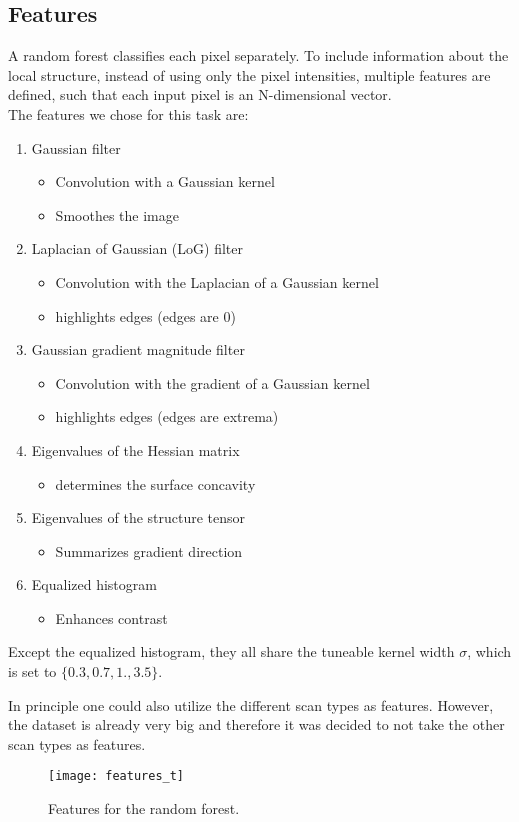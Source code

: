 \documentclass[final]{article}
\begin{document}
\subsection{Features}
A random forest classifies each pixel separately. To include information about
the local structure, instead of using only the pixel intensities, multiple
features are defined, such that each input pixel is an N-dimensional vector.\\
The features we chose for this task are:
\begin{enumerate}
\item Gaussian filter
\begin{itemize}
\item Convolution with a Gaussian kernel
\item Smoothes the image
\end{itemize}
\item Laplacian of Gaussian (LoG) filter
\begin{itemize}
\item Convolution with the Laplacian of a Gaussian kernel
\item highlights edges (edges are 0)
\end{itemize}
\item Gaussian gradient magnitude filter
\begin{itemize}
\item Convolution with the gradient of a Gaussian kernel
\item highlights edges (edges are extrema)
\end{itemize}
\item Eigenvalues of the Hessian matrix
\begin{itemize}
\item determines the surface concavity
\end{itemize}
\item Eigenvalues of the structure tensor
\begin{itemize}
\item Summarizes gradient direction
\end{itemize}
\item Equalized histogram
\begin{itemize}
\item Enhances contrast
\end{itemize}
\end{enumerate}

Except the equalized histogram, they all share the tuneable kernel width
$\sigma$, which is set to $\{0.3, 0.7, 1., 3.5\}$.

In principle one could also utilize the different scan types as features.
However, the dataset is already very big and therefore it was decided to not
take the other scan types as features.

\begin{figure}
\centering
\texttt{[image: features\_t]}
\caption{Features for the random forest. }
\label{fig:features}
\end{figure}


\vspace{0.75in}
\end{document}
